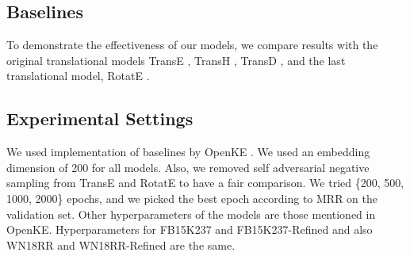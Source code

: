 \documentclass{article} \usepackage{iclr2022_conference,times}
\begin{document}
\subsection{Baselines}
To demonstrate the effectiveness of our models, we compare results with the original translational models TransE \citep{bordes2013translating}, TransH \citep{transh}, TransD \citep{ji2015knowledge}, and the last translational model, RotatE \citep{rotate}.

\subsection{Experimental Settings}
We used implementation of baselines by OpenKE \citep{han2018openke}. We used an embedding dimension of 200 for all models. Also, we removed self adversarial negative sampling from TransE and RotatE to have a fair comparison. We tried \{200, 500, 1000, 2000\} epochs, and we picked the best epoch according to MRR on the validation set. Other hyperparameters of the models are those mentioned in OpenKE. Hyperparameters for FB15K237 and FB15K237-Refined and also WN18RR and WN18RR-Refined are the same.
\end{document}
